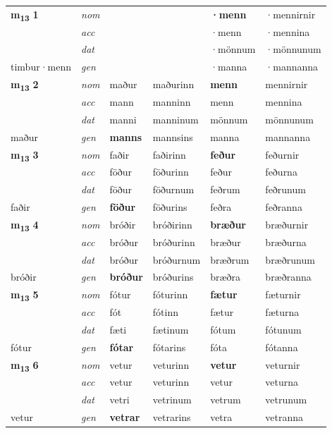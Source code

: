 \begin{longtable}[l]{X>{\footnotesize\itshape}XXXXX}
\multirow{3}{*}{{{\textbf{m{\textsubscript{13}}} \Large{\textbf{1}}}}} & nom &  &  & \textbf{·menn} & ·mennirnir \\*
 & acc &  &  & ·menn & ·mennina \\*
 & dat &  &  & ·mönnum & ·mönnunum \\*
 {\footnotesize{timbur\allowbreak ·menn}} & gen & \textbf{} &  & ·manna & ·mannanna \\
\midrule

\multirow{3}{*}{{{\textbf{m{\textsubscript{13}}} \Large{\textbf{2}}}}} & nom & maður & maðurinn & \textbf{menn} & mennirnir \\*
 & acc & mann & manninn & menn & mennina \\*
 & dat & manni & manninum & mönnum & mönnunum \\*
 {\footnotesize{maður}} & gen & \textbf{manns} & mannsins & manna & mannanna \\
\midrule

\multirow{3}{*}{{{\textbf{m{\textsubscript{13}}} \Large{\textbf{3}}}}} & nom & faðir & faðirinn & \textbf{feður} & feðurnir \\*
 & acc & föður & föðurinn & feður & feðurna \\*
 & dat & föður & föðurnum & feðrum & feðrunum \\*
 {\footnotesize{faðir}} & gen & \textbf{föður} & föðurins & feðra & feðranna \\
\midrule

\multirow{3}{*}{{{\textbf{m{\textsubscript{13}}} \Large{\textbf{4}}}}} & nom & bróðir & bróðirinn & \textbf{bræður} & bræðurnir \\*
 & acc & bróður & bróðurinn & bræður & bræðurna \\*
 & dat & bróður & bróðurnum & bræðrum & bræðrunum \\*
 {\footnotesize{bróðir}} & gen & \textbf{bróður} & bróðurins & bræðra & bræðranna \\
\midrule

\multirow{3}{*}{{{\textbf{m{\textsubscript{13}}} \Large{\textbf{5}}}}} & nom & fótur & fóturinn & \textbf{fætur} & fæturnir \\*
 & acc & fót & fótinn & fætur & fæturna \\*
 & dat & fæti & fætinum & fótum & fótunum \\*
 {\footnotesize{fótur}} & gen & \textbf{fótar} & fótarins & fóta & fótanna \\
\midrule

\multirow{3}{*}{{{\textbf{m{\textsubscript{13}}} \Large{\textbf{6}}}}} & nom & vetur & veturinn & \textbf{vetur} & veturnir \\*
 & acc & vetur & veturinn & vetur & veturna \\*
 & dat & vetri & vetrinum & vetrum & vetrunum \\*
 {\footnotesize{vetur}} & gen & \textbf{vetrar} & vetrarins & vetra & vetranna \\
\midrule


\end{longtable}
